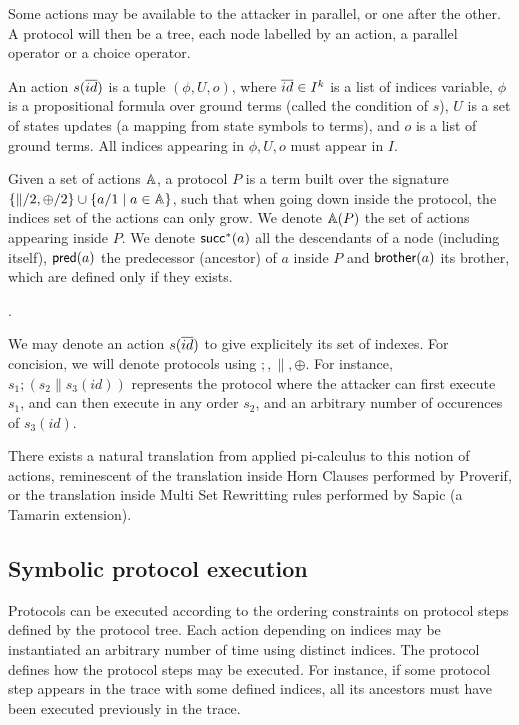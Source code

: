Some actions may be available to the attacker in parallel, or one
after the other. A protocol will then be a tree, each node labelled by an action, a parallel operator or a choice operator.

\begin{definition}
An action $s(\overline{id})$ is a tuple $(\phi,U,o)$, where $\overline{id} \in I^k$ is a list of indices variable, $\phi$ is a propositional formula over ground terms (called the condition of $s$), $U$ is a set of states updates (a mapping from state symbols to terms), and $o$ is a list of ground terms.
All indices appearing in $\phi,U,o$ must appear in $I$.

Given a set of actions $\mathbb{A}$, a protocol $P$ is a term built over the signature $\{\|/2,\oplus/2\} \cup \{a/1 \mid a \in \mathbb{A}\}$, such that when going down inside the protocol, the indices set of the actions can only grow. We denote $\mathbb{A}(P)$ the set of actions appearing inside $P$. We denote $\textsf{succ}^*(a)$ all the descendants of a node (including itself), $\textsf{pred}(a)$ the predecessor (ancestor) of $a$ inside $P$ and $\textsf{brother}(a)$ its brother, which are defined only if they exists.
\end{definition}.

We may denote an action $s(\overline{id})$ to give explicitely its set of indexes.
For concision, we will denote protocols using $;,\|,\oplus$. For instance, $s_1; (s_2 \| s_3(id))$ represents the protocol where the attacker can first execute $s_1$, and can then execute in any order $s_2$, and an arbitrary number of occurences of $s_3(id)$.

There exists a natural translation from applied pi-calculus to this notion of actions, reminescent of the translation inside Horn Clauses performed by Proverif, or the translation inside Multi Set Rewritting rules performed by Sapic (a Tamarin extension).

\subsection{Symbolic protocol execution}

Protocols can be executed according to the ordering constraints on protocol steps defined by the protocol tree.
Each action depending on indices may be instantiated an arbitrary number of time using distinct indices. The protocol defines how the protocol steps may be executed. For instance, if some protocol step appears in
the trace with some defined indices, all its ancestors must have been executed previously in the trace.


